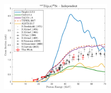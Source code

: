 % 

\begin{figure}
 \centering
 \includegraphics[width=0.49\textwidth]{./figures/48Sc.pdf}
 
%  
%  
%  
% 
\end{figure}

